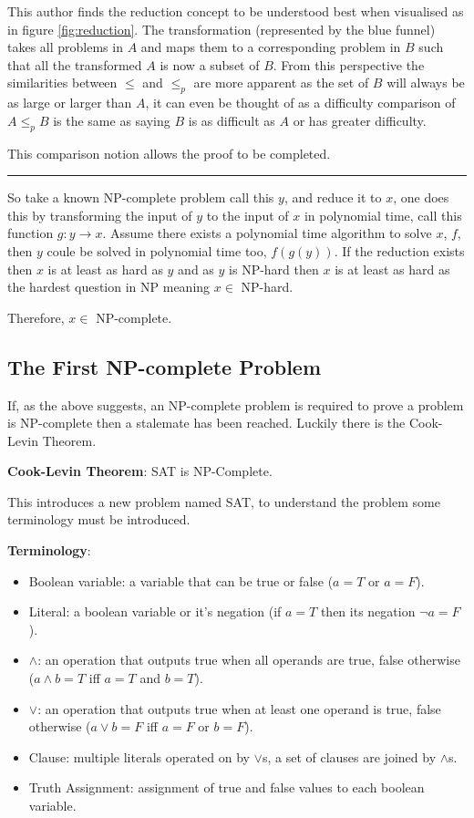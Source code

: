 \documentclass[a4paper,11pt]{report}
\newcounter{row}
\begin{document}
This author finds the reduction concept to be understood best when visualised as in figure \ref{fig:reduction}. The transformation (represented by the blue funnel) takes all problems in $A$ and maps them to a corresponding problem in $B$ such that all the transformed $A$ is now a subset of $B$. From this perspective the similarities between $\leq$ and $\leq_p$ are more apparent as the set of $B$ will always be as large or larger than $A$, it can even be thought of as a difficulty comparison of $A\leq_p B$ is the same as saying $B$ is as difficult as $A$ or has greater difficulty.

This comparison notion allows the proof to be completed.

\noindent\rule{4cm}{0.4pt}

So take a known NP-complete problem call this $y$, and reduce it to $x$, one does this by transforming the input of $y$ to the input of $x$ in polynomial time, call this function $g: y\rightarrow x$. Assume there exists a polynomial time algorithm to solve $x$, $f$, then $y$ coule be solved in polynomial time too, $f(g(y))$. If the reduction exists then $x$ is at least as hard as $y$ and as $y$ is NP-hard then $x$ is at least as hard as the hardest question in NP meaning $x \in$ NP-hard.

Therefore, $x\in $ NP-complete.

\subsection{The First NP-complete Problem} 

If, as the above suggests, an NP-complete problem is required to prove a problem is NP-complete then a stalemate has been reached. Luckily there is the Cook-Levin Theorem.

\textbf{Cook-Levin Theorem}\cite{compcomplexityamodernapproach}: SAT is NP-Complete.

This introduces a new problem named SAT, to understand the problem some terminology must be introduced.

\textbf{Terminology}:
\begin{itemize}
\item Boolean variable: a variable that can be true or false ($a=T$ or $a=F$).
\item Literal: a boolean variable or it's negation (if $a = T$ then its negation $\neg a = F$).
\item $\land$: an operation that outputs true when all operands are true, false otherwise ($a\land b = T$ iff $a=T$ and $b=T$).
\item $\lor$: an operation that outputs true when at least one operand is true, false otherwise ($a\lor b = F$ iff $a=F$ or $b=F$).
\item Clause: multiple literals operated on by $\lor$s, a set of clauses are joined by $\land$s.
\item Truth Assignment: assignment of true and false values to each boolean variable. 
\end{itemize}
\end{document}

